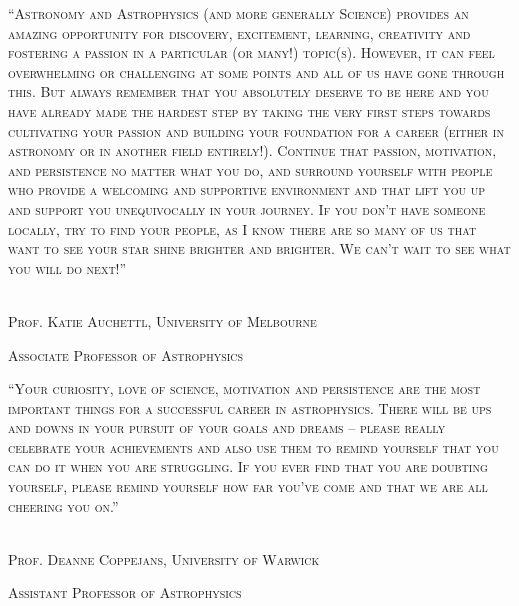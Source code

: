 \documentclass[12pt]{article}
\begin{document}


\pagebreak
\setcounter{page}{1}

\tableofcontents

\pagebreak
\strut \vspace{130pt}


\noindent \textsc{``Astronomy and Astrophysics (and more generally Science) provides an amazing opportunity for discovery, excitement, learning, creativity and fostering a passion in a particular (or many!) topic(s). However, it can feel overwhelming or challenging at some points and all of us have gone through this. But always remember that you absolutely deserve to be here and you have already made the hardest step by taking the very first steps towards cultivating your passion and building your foundation for a career (either in astronomy or in another field entirely!). Continue that passion, motivation, and persistence no matter what you do, and surround yourself with people who provide a welcoming and supportive environment and that lift you up and support you unequivocally in your journey. If you don't have someone locally, try to find your people, as I know there are so many of us that want to see your star shine brighter and brighter. We can't wait to see what you will do next!''}
\\
\\
\strut\hfill \textemdash \textsc{Prof. Katie Auchettl, University of Melbourne}\\
\strut \hfill \footnotesize{\textsc{Associate Professor of Astrophysics}}
\normalsize



\pagebreak
\strut \vspace{185pt}

\noindent \textsc{``Your curiosity, love of science, motivation and persistence are the most important things for a successful career in astrophysics. There will be ups and downs in your pursuit of your goals and dreams -- please really celebrate your achievements and also use them to remind yourself that you can do it when you are struggling. If you ever find that you are doubting yourself, please remind yourself how far you've come and that we are all cheering you on.''}
\\
\\
\strut\hfill \textemdash \textsc{Prof. Deanne Coppejans, University of Warwick}\\
\strut \hfill \footnotesize{\textsc{Assistant Professor of Astrophysics}}
\normalsize
\end{document}
